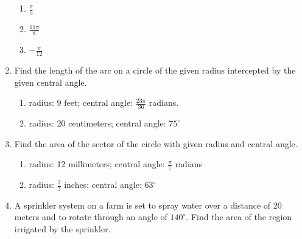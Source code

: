 \documentclass[12pt]{article}
\newif\ifans
\begin{document}
\begin{enumerate}
\begin{enumerate}
\item $\displaystyle \frac{\pi}{5}$

\ifans \fbox{Quadrant I} \fi

\item $\displaystyle \frac{11\pi}{8}$

\ifans \fbox{Quadrant III} \fi

\item $\displaystyle -\frac{\pi}{12}$

\ifans \fbox{Quadrant IV} \fi

\end{enumerate}

\item Find the length of the arc on a circle of the given radius intercepted by the given central angle.  

\begin{enumerate}

\item radius: 9 feet; central angle: $\frac{23\pi}{36}$ radians.

\ifans \fbox{$\displaystyle \frac{23\pi}{4}$ feet} \fi

\item radius: 20 centimeters; central angle: $75^{\circ}$

\ifans \fbox{$\displaystyle \frac{25\pi}{3}$ centimeters} \fi

\end{enumerate}


\item Find the area of the sector of the circle with given radius and central angle.

\begin{enumerate}

\item radius: 12 millimeters; central angle: $\displaystyle \frac{\pi}{7}$ radians

\ifans \fbox{$\displaystyle \frac{72\pi}{7}$ square millimeters} \fi

\item radius: $\displaystyle \frac{2}{3}$ inches; central angle: $63^{\circ}$

\ifans \fbox{$\displaystyle \frac{7\pi}{90}$ square inches} \fi

\end{enumerate}

\item A sprinkler system on a farm is set to spray water over a distance of 20 meters and to rotate through an angle of $140^{\circ}$.  Find the area of the region irrigated by the sprinkler.

\ifans \fbox{$\displaystyle \frac{1400\pi}{9}$ square meters}\fi


\end{enumerate}
\end{document}
